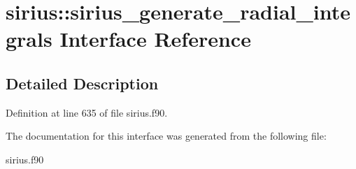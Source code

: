 \hypertarget{interfacesirius_1_1sirius__generate__radial__integrals}{}\section{sirius\+:\+:sirius\+\_\+generate\+\_\+radial\+\_\+integrals Interface Reference}
\label{interfacesirius_1_1sirius__generate__radial__integrals}


\subsection{Detailed Description}


Definition at line 635 of file sirius.\+f90.



The documentation for this interface was generated from the following file\+:\begin{DoxyCompactItemize}
\item 
sirius.\+f90\end{DoxyCompactItemize}
